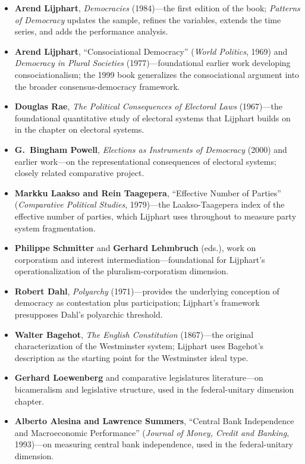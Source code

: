 \documentclass[12pt]{article}
\begin{document}
\begin{itemize}[leftmargin=*, itemsep=4pt]
    \item \textbf{Arend Lijphart}, \textit{Democracies} (1984)---the first edition of the book; \textit{Patterns of Democracy} updates the sample, refines the variables, extends the time series, and adds the performance analysis.
    \item \textbf{Arend Lijphart}, ``Consociational Democracy'' (\textit{World Politics}, 1969) and \textit{Democracy in Plural Societies} (1977)---foundational earlier work developing consociationalism; the 1999 book generalizes the consociational argument into the broader consensus-democracy framework.
    \item \textbf{Douglas Rae}, \textit{The Political Consequences of Electoral Laws} (1967)---the foundational quantitative study of electoral systems that Lijphart builds on in the chapter on electoral systems.
    \item \textbf{G.\ Bingham Powell}, \textit{Elections as Instruments of Democracy} (2000) and earlier work---on the representational consequences of electoral systems; closely related comparative project.
    \item \textbf{Markku Laakso and Rein Taagepera}, ``Effective Number of Parties'' (\textit{Comparative Political Studies}, 1979)---the Laakso-Taagepera index of the effective number of parties, which Lijphart uses throughout to measure party system fragmentation.
    \item \textbf{Philippe Schmitter} and \textbf{Gerhard Lehmbruch} (eds.), work on corporatism and interest intermediation---foundational for Lijphart's operationalization of the pluralism-corporatism dimension.
    \item \textbf{Robert Dahl}, \textit{Polyarchy} (1971)---provides the underlying conception of democracy as contestation plus participation; Lijphart's framework presupposes Dahl's polyarchic threshold.
    \item \textbf{Walter Bagehot}, \textit{The English Constitution} (1867)---the original characterization of the Westminster system; Lijphart uses Bagehot's description as the starting point for the Westminster ideal type.
    \item \textbf{Gerhard Loewenberg} and comparative legislatures literature---on bicameralism and legislative structure, used in the federal-unitary dimension chapter.
    \item \textbf{Alberto Alesina and Lawrence Summers}, ``Central Bank Independence and Macroeconomic Performance'' (\textit{Journal of Money, Credit and Banking}, 1993)---on measuring central bank independence, used in the federal-unitary dimension.

\end{itemize}
\end{document}
